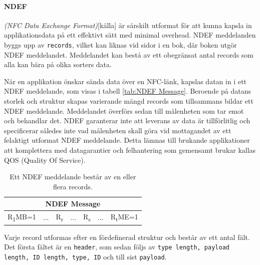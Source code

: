 \documentclass[11pt]{article}
\begin{document}
\paragraph{NDEF}

\textit{(NFC Data Exchange Format)}[källa] är särskilt utformat för att kunna kapsla in applikationsdata på ett effektivt sätt med minimal overhead. NDEF meddelanden byggs upp av \texttt{records}, vilket kan liknas vid sidor i en bok, där boken utgör NDEF meddelandet. Meddelandet kan bestå av ett obegränsat antal records som alla kan bära på olika sorters data.  

När en applikation önskar sända data över en NFC-länk, kapslas datan in i ett NDEF meddelande, som visas i tabell \ref{tab:NDEF Message}. Beroende på datans storlek och struktur skapas varierande mängd records som tillsammans bildar ett NDEF meddelande. Meddelandet överförs sedan till målenheten som tar emot och behandlar det. NDEF garanterar inte att leverans av data är tillförlitlig och specificerar således inte vad målenheten skall göra vid mottagandet av ett felaktigt utformat NDEF meddelande. Detta lämnas till brukande applikationer att komplettera med datagarantier och felhantering som gemensamt brukar kallas QOS (Quality Of Service).



\begin{table}
\centering
\begin{tabular}{ |c|c|c|c|c|c|c| }
\hline
\multicolumn{7}{|c|}{\textbf{NDEF Message}} \\
\hline
R\textsubscript{1}MB=1 & ... & R\textsubscript{r} & ... & R\textsubscript{s} & ... & R\textsubscript{t}ME=1 \\
\hline
\end{tabular}
\caption{Ett NDEF meddelande består av en eller flera  records.}
\label{tab:NDEF_Message}
\end{table}


Varje record utformas efter en fördefinerad struktur och består av ett antal fält. Det första fältet är en \texttt{header}, som sedan följs av \texttt{type length, payload length, ID length, type, ID} och till sist \texttt{payload}.

\end{document}
